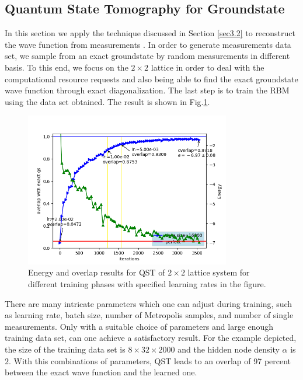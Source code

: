 \documentclass{article}
\begin{document}
\subsection{Quantum State Tomography for Groundstate}\label{sec5.3}

In this section we apply the technique discussed in Section \ref{sec3.2} to reconstruct the wave function from measurements . In order to generate measurements data set, we sample from an exact groundstate by random measurements in different basis. To this end, we focus on the $2 \times 2$ lattice in order to deal with the computational resource requests and also being able to find the exact groundstate wave function through exact diagonalization. The last step is to train the RBM using the data set obtained. The result is shown in Fig.\hspace{0.2mm}\ref{fig:qst}.

\begin{figure}[!htb]
	\centering
	\includegraphics[width=0.8\textwidth]{./images/2x2_16k_1.png}
	\caption{\label{fig:qst} Energy and overlap results for QST of $2 \times 2$ lattice system for different training phases with specified learning rates in the figure.} 
\end{figure}

There are many intricate parameters which one can adjust during training, such as learning rate, batch size, number of Metropolis samples, and number of single measurements. Only with a suitable choice of parameters and large enough training data set, can one achieve a satisfactory result. For the example depicted, the size of the training data set is $8 \times 32 \times 2000$  and the hidden node density $\alpha$ is $2$. With this combinations of parameters, QST leads to an overlap of 97 percent between the exact wave function and the learned one. 
\end{document}
